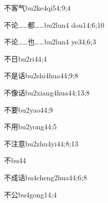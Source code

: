 \begin{verbete}{不客气}{bu2ke4qi5}{4;9;4}
\end{verbete}

\begin{verbete}{不论……都……}{bu2lun4 dou1}{4;6;10}
\end{verbete}

\begin{verbete}{不论……也……}{bu2lun4 ye3}{4;6;3}
\end{verbete}

\begin{verbete}{不日}{bu2ri4}{4;4}
\end{verbete}

\begin{verbete}{不是话}{bu2shi4hua4}{4;9;8}
\end{verbete}

\begin{verbete}{不像话}{bu2xiang4hua4}{4;13;8}
\end{verbete}

\begin{verbete}{不要}{bu2yao4}{4;9}
\end{verbete}

\begin{verbete}{不用}{bu2yong4}{4;5}
\end{verbete}

\begin{verbete}{不注意}{bu2zhu4yi4}{4;8;13}
\end{verbete}

\begin{verbete}{不}{bu4}{4}
\end{verbete}

\begin{verbete}{不成话}{bu4cheng2hua4}{4;6;8}
\end{verbete}

\begin{verbete}{不公}{bu4gong1}{4;4}
\end{verbete}


